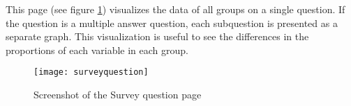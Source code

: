 This page (see figure \ref{fig:surveyquestion}) visualizes the data of all groups on a single question. If the question is a multiple answer question, each subquestion is presented as a separate graph. This visualization is useful to see the differences in the proportions of each variable in each group.

\begin{figure}[h]
\centering
\texttt{[image: surveyquestion]}
\caption{Screenshot of the Survey question page}
\label{fig:surveyquestion}
\end{figure}